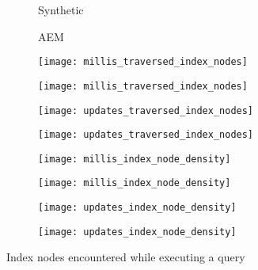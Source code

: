 \documentclass[abstracton,12pt]{scrartcl}
\theoremstyle{definition}
\begin{document}
\begin{figure}[h]
  \centering
  \begin{subfigure}{0.49\linewidth}
    \centering
    Synthetic
  \end{subfigure}
  \begin{subfigure}{0.49\linewidth}
    \centering
    AEM
  \end{subfigure}
  \begin{subfigure}{0.49\linewidth}
    \centering
    \texttt{[image: millis\_traversed\_index\_nodes]}
    \caption{}
    \label{fig:trav_nodes_synthetic_millis}
  \end{subfigure}
  \begin{subfigure}{0.49\linewidth}
    \centering
    \texttt{[image: millis\_traversed\_index\_nodes]} 
    \caption{}
    \label{fig:trav_nodes_aem_millis}
  \end{subfigure}
  \begin{subfigure}{0.49\linewidth}
    \centering
    \texttt{[image: updates\_traversed\_index\_nodes]}
    \caption{}
    \label{fig:trav_nodes_synthetic_updates}
  \end{subfigure}
  \begin{subfigure}{0.49\linewidth}
    \centering
    \texttt{[image: updates\_traversed\_index\_nodes]}
    \caption{}
    \label{fig:trav_nodes_aem_updates}
  \end{subfigure}

  \begin{subfigure}{0.49\linewidth}
    \centering
    \texttt{[image: millis\_index\_node\_density]}
    \caption{}
    \label{fig:trav_node_density_synthetic_millis}
  \end{subfigure}
  \begin{subfigure}{0.49\linewidth}
    \centering
    \texttt{[image: millis\_index\_node\_density]} 
    \caption{}
    \label{fig:trav_node_density_aem_millis}
  \end{subfigure}
  \begin{subfigure}{0.49\linewidth}
    \centering
    \texttt{[image: updates\_index\_node\_density]}
    \caption{}
    \label{fig:trav_node_density_synthetic_updates}
  \end{subfigure}
  \begin{subfigure}{0.49\linewidth}
    \centering
    \texttt{[image: updates\_index\_node\_density]}
    \caption{}
    \label{fig:trav_node_density_aem_updates}
  \end{subfigure}
 \caption{Index nodes encountered while executing a query}
 \label{fig:query_runtime}
\end{figure}
\end{document}
